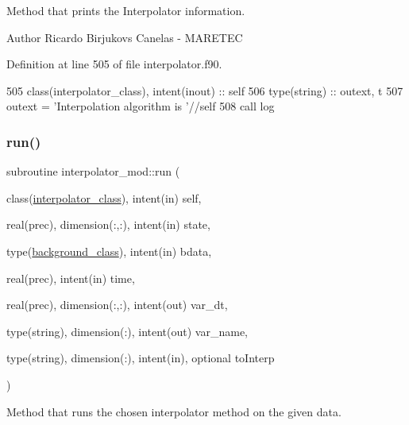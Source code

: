 Method that prints the Interpolator information. 

\begin{DoxyAuthor}{Author}
Ricardo Birjukovs Canelas -\/ M\+A\+R\+E\+T\+EC 
\end{DoxyAuthor}


Definition at line 505 of file interpolator.\+f90.


\begin{DoxyCode}
505     \textcolor{keywordtype}{class}(interpolator\_class), \textcolor{keywordtype}{intent(inout)} :: self
506     \textcolor{keywordtype}{type}(string) :: outext, t
507     outext = \textcolor{stringliteral}{'Interpolation algorithm is '}//self%
508     \textcolor{keyword}{call }log%
\end{DoxyCode}
\mbox{\label{namespaceinterpolator__mod_aeb33b9e901668a304b49a9cc7e42969c}} 
\subsubsection{\texorpdfstring{run()}{run()}}
{\footnotesize\ttfamily subroutine interpolator\+\_\+mod\+::run (\begin{DoxyParamCaption}\item[{class(\mbox{\hyperlink{structinterpolator__mod_1_1interpolator__class}{interpolator\+\_\+class}}), intent(in)}]{self,  }\item[{real(prec), dimension(\+:,\+:), intent(in)}]{state,  }\item[{type(\mbox{\hyperlink{structbackground__mod_1_1background__class}{background\+\_\+class}}), intent(in)}]{bdata,  }\item[{real(prec), intent(in)}]{time,  }\item[{real(prec), dimension(\+:,\+:), intent(out)}]{var\+\_\+dt,  }\item[{type(string), dimension(\+:), intent(out)}]{var\+\_\+name,  }\item[{type(string), dimension(\+:), intent(in), optional}]{to\+Interp }\end{DoxyParamCaption})\hspace{0.3cm}{\ttfamily [private]}}



Method that runs the chosen interpolator method on the given data. 

